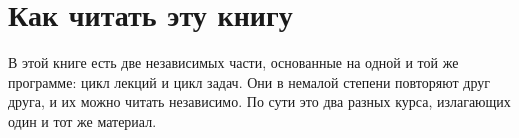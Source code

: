 \documentclass[12pt]{book}
\theoremstyle{upshape}
\theoremstyle{generic}
\theoremstyle{upshapenonumber}
\newcommand{\следствие}{%
     \refstepcounter{teorema}
     {\noindent\bf Следствие \thechapter.\arabic{teorema}:\ }}
\newcommand{\пример}{%
     \refstepcounter{teorema}
     {\noindent\bf Пример \thechapter.\arabic{teorema}:\ }}
\newcommand{\лемма}{%
     \refstepcounter{teorema}
     {\noindent\bf Лемма \thechapter.\arabic{teorema}:\ }}
\newcommand{\теорема}{%
     \refstepcounter{teorema}
     {\noindent\bf Теорема \thechapter.\arabic{teorema}:\ }}
\newcommand{\утверждение}{%
     \refstepcounter{teorema}
     {\noindent\bf Утверждение \thechapter.\arabic{teorema}:\ }}
\begin{document}
%
%
%
%
%
%
%
%
%
\section{Как читать эту книгу}

В этой книге есть две независимых части,
основанные на одной и той же программе:
цикл лекций и цикл задач. Они в немалой
степени повторяют друг друга, и их можно
читать независимо. По сути это два разных
курса, излагающих один и тот же материал.
\end{document}
